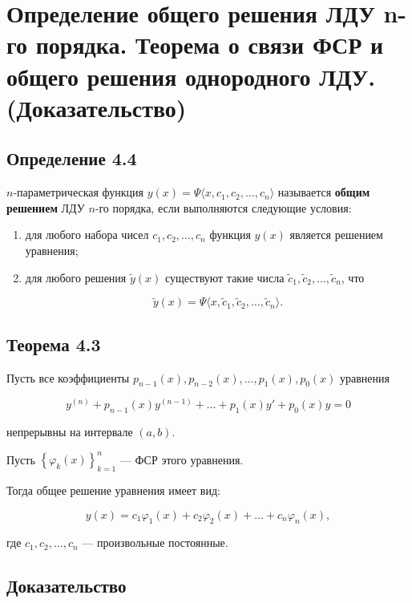 {
	\section{Определение общего решения ЛДУ n-го порядка. Теорема о связи ФСР и общего решения однородного ЛДУ. (Доказательство)}

	\subsection*{Определение 4.4}

	\( n \)-параметрическая функция \( y(x) = \Psi\langle x, c_1, c_2, \ldots, c_n \rangle \) называется \textbf{общим решением} ЛДУ \( n \)-го порядка, если выполняются следующие условия:

	\begin{enumerate}
	\item для любого набора чисел \( c_1, c_2, \ldots, c_n \) функция \( y(x) \) является решением уравнения;

	\item для любого решения \( \tilde{y}(x) \) существуют такие числа \( \tilde{c}_1, \tilde{c}_2, \ldots, \tilde{c}_n \), что
	

	\[
	\tilde{y}(x) = \Psi\langle x, \tilde{c}_1, \tilde{c}_2, \ldots, \tilde{c}_n \rangle.
	\]


	\end{enumerate}



	\subsection*{Теорема 4.3}

	Пусть все коэффициенты \( p_{n-1}(x), p_{n-2}(x), \ldots, p_1(x), p_0(x) \) уравнения


	\[
	y^{(n)} + p_{n-1}(x)y^{(n-1)} + \ldots + p_1(x)y' + p_0(x)y = 0 \tag{4.1}
	\]


	непрерывны на интервале \( (a, b) \).

	Пусть \( \left\{ \varphi_k(x) \right\}_{k=1}^{n} \) — ФСР этого уравнения.

	Тогда общее решение уравнения имеет вид:


	\[
	y(x) = c_1 \varphi_1(x) + c_2 \varphi_2(x) + \ldots + c_n \varphi_n(x),
	\]


	где \( c_1, c_2, \ldots, c_n \) — произвольные постоянные.

	\subsection*{Доказательство}

}

